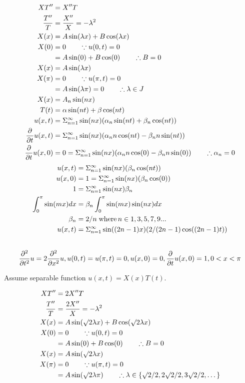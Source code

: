 \documentclass[12pt,USLetter]{article}
\begin{document}
\begin{align*}
XT^{\prime\prime} &= X^{\prime\prime} T \\
\frac{T^{\prime\prime}}{T} &= \frac{X^{\prime\prime}}{X} = -\lambda^2 \\
X(x) &= A\sin(\lambda x) + B\cos(\lambda x) \\
X(0) &= 0 \qquad \because u(0,t) = 0 \\
&= A\sin(0) + B\cos(0) \qquad \therefore B = 0 \\
X(x) &= A\sin(\lambda x) \\
X(\pi) &= 0 \qquad \because u(\pi,t) = 0 \\
&= A\sin(\lambda \pi) = 0 \qquad \therefore \lambda \in J \\
X(x) &= A_n\sin(nx) \\
T(t) &= \alpha\sin(nt) + \beta\cos(nt) \\
u(x,t) &= \Sigma_{n=1}^{\infty}\sin(nx) (\alpha_n\sin(nt) + \beta_n\cos(nt)) \\
\frac{\partial}{\partial{t}}u(x,t) &= \Sigma_{n=1}^\infty\sin(nx) (\alpha_n n\cos(nt) - \beta_n n\sin(nt)) \\
\frac{\partial}{\partial{t}}u(x,0) &= 0 = \Sigma_{n=1}^\infty\sin(nx) (\alpha_n n\cos(0) - \beta_n n\sin(0)) \qquad \therefore \alpha_n = 0 
\end{align*}
\begin{align*}
u(x,t) &= \Sigma_{n=1}^{\infty}\sin(nx) (\beta_n\cos(nt)) \\
u(x,0) &= 1 = \Sigma_{n=1}^{\infty}\sin(nx) (\beta_n\cos(0)) \\
1 &= \Sigma_{n=1}^{\infty}\sin(nx)\beta_n \\
\int_0^\pi\sin(mx)dx &= \beta_n\int_0^\pi\sin(mx)\sin(nx)dx \\
\beta_n &= 2 / n \;\mathrm{where\,} n \in {1, 3, 5, 7, 9 ...} \\
u(x,t) &= \Sigma_{n=1}^{\infty}\sin((2n-1)x) (2/(2n-1)\cos((2n-1)t)) 
\end{align*} 

\subsection{}

\begin{equation*}
\frac{\partial^2}{\partial{t}^2}u = 2\frac{\partial^2}{\partial{x}^2}u, u(0,t) = u(\pi, t) = 0, u(x,0) = 0, \frac{\partial}{\partial{t}}u(x,0) = 1, 0<x<\pi
\end{equation*}

Assume separable function $u(x,t) = X(x)T(t)$.

\begin{align*}
XT^{\prime\prime} &= 2X^{\prime\prime} T \\
\frac{T^{\prime\prime}}{T} &= \frac{2X^{\prime\prime}}{X} = -\lambda^2 \\
X(x) &= A\sin(\surd 2\lambda x) + B\cos(\surd 2\lambda x) \\
X(0) &= 0 \qquad \because u(0,t) = 0 \\
&= A\sin(0) + B\cos(0) \qquad \therefore B = 0 \\
X(x) &= A\sin(\surd 2\lambda x) \\
X(\pi) &= 0 \qquad \because u(\pi,t) = 0 \\
&= A\sin(\surd 2\lambda\pi) \qquad \therefore \lambda \in \{\surd 2/2, 2\surd 2/2, 3\surd 2/2, \dots \} \\
\end{align*}
\end{document}
